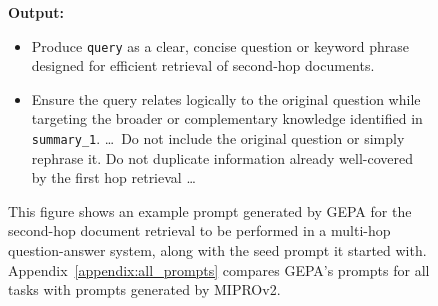\begin{figure}[!ht]
\begin{tcolorbox}
\vspace{1mm}
\textbf{Output:}
\begin{itemize}[left=0em]
    \item Produce \texttt{query} as a clear, concise question or keyword phrase designed for efficient retrieval of second-hop documents.
    \item Ensure the query relates logically to the original question while targeting the broader or complementary knowledge identified in \texttt{summary\_1}. \ldots~Do not include the original question or simply rephrase it. Do not duplicate information already well-covered by the first hop
retrieval \ldots
\end{itemize}
\end{tcolorbox}

\caption{This figure shows an example prompt generated by GEPA for the second-hop document retrieval to be performed in a multi-hop question-answer system, along with the seed prompt it started with. Appendix~\ref{appendix:all_prompts} compares GEPA's prompts for all tasks with prompts generated by MIPROv2.}\label{fig:main_fig_prompt_example}
\end{figure}





